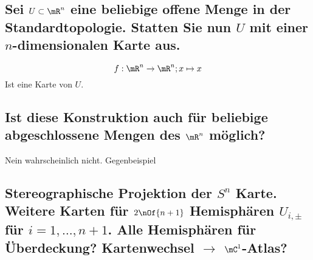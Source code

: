 \documentclass[11pt,a4paper]{scrartcl}
\begin{document}
	\subsection{Sei $U \subset \mR^n$ eine beliebige offene Menge in der Standardtopologie. Statten Sie nun $U$ mit einer $n$-dimensionalen Karte aus.}
	\begin{equation}
		f : \mR^n \to \mR^n; x \mapsto x
	\end{equation}
	Ist eine Karte von $U$.
	\subsection{Ist diese Konstruktion auch für beliebige abgeschlossene Mengen des $\mR^n$ möglich?}
	Nein wahrscheinlich nicht. Gegenbeispiel
	\subsection{Stereographische Projektion der $S^n$ Karte. Weitere Karten für $2\nOf{n+1}$ Hemisphären $U_{i,\pm}$ für $i = 1,\dots,n+1$. Alle Hemisphären für Überdeckung? Kartenwechsel $\rightarrow$ $\mC^1$-Atlas?}
\end{document}
